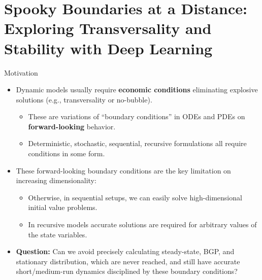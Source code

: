\documentclass[aspectratio=169,10pt]{beamer}
\newcommand{\emphcolor}[1]{\textbf{\textcolor{emphcolorval}{#1}}}
\begin{document}
\section{\textcolor{PennBlue}{Spooky Boundaries at a Distance: Exploring Transversality and Stability with Deep Learning}}

\begin{frame}{Motivation}
	
	\begin{itemize}
		\item Dynamic models usually require \emphcolor{economic conditions} eliminating explosive solutions (e.g., transversality or no-bubble).\vspace{0.1in}
		\begin{itemize}
			\item These are variations of ``boundary conditions'' in ODEs and PDEs on \emphcolor{forward-looking} behavior.\vspace{0.1in}
			\item Deterministic, stochastic, sequential, recursive formulations all require conditions in some form.
		\end{itemize}
		\medskip
		\item These forward-looking boundary conditions are the key limitation on increasing dimensionality:\vspace{0.1in}
		\begin{itemize} 
			\item Otherwise, in sequential setups, we can easily solve high-dimensional initial value problems.\vspace{0.1in}
			\item In recursive models accurate solutions are required for arbitrary values of the state variables.\vspace{0.1in}
		\end{itemize}
		\medskip
		\item \emphcolor{Question:} Can we avoid precisely calculating steady-state, BGP, and stationary distribution, which are never reached, and still have accurate short/medium-run dynamics disciplined by these boundary conditions?
	\end{itemize}
\end{frame}
\end{document}
